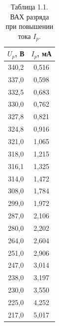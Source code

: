 \documentclass[a4paper]{article}
\begin{document}
\begin{enumerate}
\begin{table}[h!]
\begin{minipage}{0.48\textwidth}
        \label{tab:vac_increase}
        \begin{tabular}{|c|c|}
            \hline
            $U_p$, В & $I_p$, мА \\ \hline
            340,2 & 0,516 \\ \hline
            337,0 & 0,598 \\ \hline
            332,5 & 0,683 \\ \hline
            330,0 & 0,762 \\ \hline
            327,8 & 0,821 \\ \hline
            324,8 & 0,916 \\ \hline
            321,0 & 1,065 \\ \hline
            318,0 & 1,215 \\ \hline
            316,1 & 1,325 \\ \hline
            314,0 & 1,472 \\ \hline
            308,0 & 1,784 \\ \hline
            299,0 & 1,972 \\ \hline
            287,0 & 2,106 \\ \hline
            280,0 & 2,202 \\ \hline
            264,0 & 2,604 \\ \hline
            251,0 & 2,906 \\ \hline
            247,0 & 3,014 \\ \hline
            238,0 & 3,197 \\ \hline
            230,0 & 3,550 \\ \hline
            225,0 & 4,252 \\ \hline
            217,0 & 5,017 \\ \hline
        \end{tabular}
\caption{Таблица 1.1. ВАХ разряда при повышении тока $I_p$.}
    \end{minipage}
    \hfill
    \begin{minipage}{0.48\textwidth}
        \centering


\end{minipage}
\end{table}
\end{enumerate}
\end{document}
